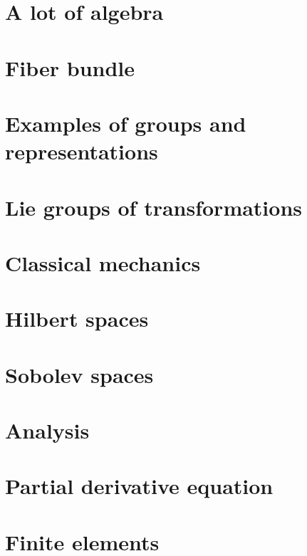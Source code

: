 \chapter{A lot of algebra}




\chapter{Fiber bundle}



\chapter{Examples of groups and representations}        \label{ChapThoComsGroupes}



\chapter{Lie groups of transformations}


\chapter{Classical mechanics}


\chapter{Hilbert spaces}



\chapter{Sobolev spaces}


\chapter{Analysis}




\chapter{Partial derivative equation}


\chapter{Finite elements}



